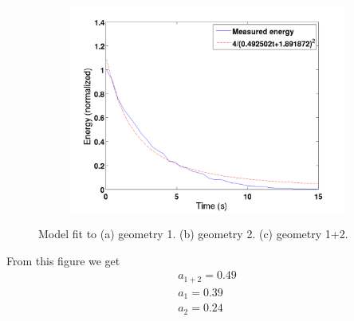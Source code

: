 \begin{figure}[htbp]
\begin{subfigure}{.45\textwidth}
	\caption{}
	\label{fig:resultSquare2}
\end{subfigure}\\
\begin{subfigure}{.45\textwidth}
	\centering
	\includegraphics[width=\textwidth]{img/resultSquare1+2}
	\caption{}
	\label{fig:resultSquare1+2}
\end{subfigure}
\caption{Model fit to (a) geometry 1. (b) geometry 2. (c) geometry 1+2.}
\label{fig:resultSquare}
\end{figure}

From this figure we get
\begin{eqnarray}
a_{1+2} = 0.49\\
a_1 = 0.39 \\
a_2 =  0.24
\end{eqnarray}

